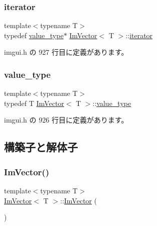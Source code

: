 \mbox{\label{class_im_vector_a74b5478f1f6fd471cc71219bce483db6}} 
\subsubsection{\texorpdfstring{iterator}{iterator}}
{\footnotesize\ttfamily template$<$typename T$>$ \\
typedef \mbox{\hyperlink{class_im_vector_a8bd77e4e7581d8e5f9e98d7c2f3c2a80}{value\+\_\+type}}$\ast$ \mbox{\hyperlink{class_im_vector}{Im\+Vector}}$<$ T $>$\+::\mbox{\hyperlink{class_im_vector_a74b5478f1f6fd471cc71219bce483db6}{iterator}}}



 imgui.\+h の 927 行目に定義があります。

\mbox{\label{class_im_vector_a8bd77e4e7581d8e5f9e98d7c2f3c2a80}} 
\subsubsection{\texorpdfstring{value\+\_\+type}{value\_type}}
{\footnotesize\ttfamily template$<$typename T$>$ \\
typedef T \mbox{\hyperlink{class_im_vector}{Im\+Vector}}$<$ T $>$\+::\mbox{\hyperlink{class_im_vector_a8bd77e4e7581d8e5f9e98d7c2f3c2a80}{value\+\_\+type}}}



 imgui.\+h の 926 行目に定義があります。



\subsection{構築子と解体子}
\mbox{\label{class_im_vector_a547fff373659fd848c3ecc6b25a83f25}} 
\subsubsection{\texorpdfstring{Im\+Vector()}{ImVector()}}
{\footnotesize\ttfamily template$<$typename T$>$ \\
\mbox{\hyperlink{class_im_vector}{Im\+Vector}}$<$ T $>$\+::\mbox{\hyperlink{class_im_vector}{Im\+Vector}} (\begin{DoxyParamCaption}{ }\end{DoxyParamCaption})\hspace{0.3cm}{\ttfamily [inline]}}



